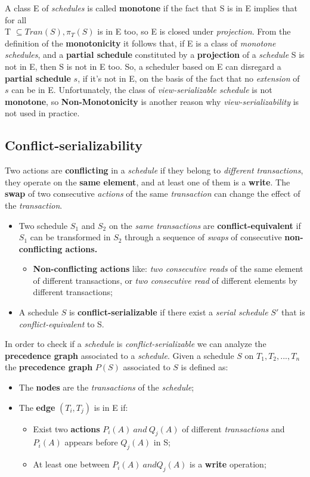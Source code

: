 \documentclass{article}
\begin{document}
A class E of \emph{schedules} is called \textbf{monotone} if the fact that S is in E implies that for all \\T $\subseteq Tran(S), \pi_{T}(S)$ is in E too, so E is closed under \emph{projection}. From the definition of the \textbf{monotonicity} it follows that, if E is a class of \emph{monotone} \emph{schedules}, and a \textbf{partial schedule} constituted by a \textbf{projection} of a \emph{schedule} S is not in E, then S is not in E too. So, a scheduler based on E can disregard a \textbf{partial schedule} $s$, if it's not in E, on the basis of the fact that no \emph{extension} of $s$ can be in E. Unfortunately, the class of \emph{view-serializable schedule} is not \textbf{monotone}, so \textbf{Non-Monotonicity} is another reason why \emph{view-serializability} is not used in practice. 
\subsection{Conflict-serializability}
Two actions are \textbf{conflicting} in a \emph{schedule} if they belong to \emph{different transactions}, they operate on the \textbf{same element}, and at least one of them is a \textbf{write}. The \textbf{swap} of two consecutive \emph{actions} of the same \emph{transaction} can change the effect of the \emph{transaction}. 
\begin{itemize}
\item Two schedule $S_1$ and $S_2$ on the \emph{same transactions} are \textbf{conflict-equivalent} if $S_1$ can be transformed in $S_2$ through a sequence of \emph{swaps} of consecutive \textbf{non-conflicting actions.}
\begin{itemize}
\item \textbf{Non-conflicting actions} like: \emph{two consecutive reads} of the same element of different transactions, or \emph{two consecutive read} of different elements by different transactions;
\end{itemize}
\item A schedule $S$ is \textbf{conflict-serializable} if there exist a \emph{serial schedule} $S'$ that is \emph{conflict-equivalent} to S.
\end{itemize}
In order to check if a \emph{schedule} is \emph{conflict-serializable} we can analyze the \textbf{precedence graph} associated to a \emph{schedule}.
Given a schedule $S$ on $T_1, T_2, ... , T_n$ the \textbf{precedence graph} $P(S)$ associated to $S$ is defined as:
\begin{itemize}
\item The \textbf{nodes} are the \emph{transactions} of the \emph{schedule};
\item The \textbf{edge} $(T_i, T_j)$ is in E if:
\begin{itemize}
\item Exist two \textbf{actions} $P_i(A)\ and\ Q_j(A)$ of different \emph{transactions} and $P_i(A)$ appears before $Q_j(A)$ in S;
\item At least one between $P_i(A)\ and Q_j(A)$  is a \textbf{write} operation; 
\end{itemize}
\end{itemize}
\end{document}
